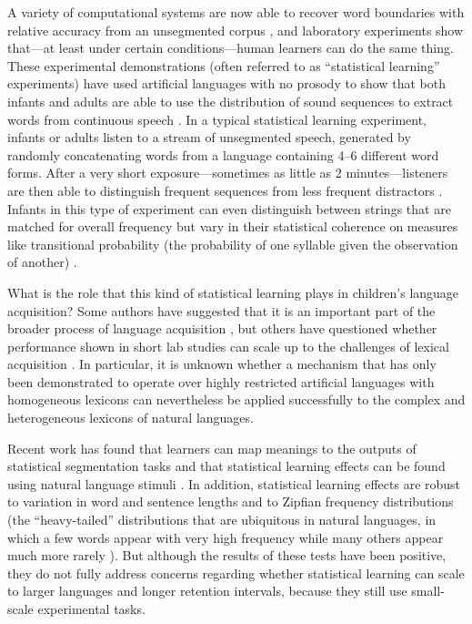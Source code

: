 \documentclass[10pt]{article}
\begin{document}
A variety of computational systems are now able to recover word boundaries with relative accuracy from an unsegmented corpus \cite{goldwater2009,brent1999a}, and laboratory experiments show that---at least under certain conditions---human learners can do the same thing. These experimental demonstrations (often referred to as ``statistical learning'' experiments) have used artificial languages with no prosody to show that both infants and adults are able to use the distribution of sound sequences to extract words from continuous speech \cite{saffran1996a,saffran1996b}. In a typical statistical learning experiment, infants or adults listen to a stream of unsegmented speech, generated by randomly concatenating words from a language containing 4--6 different word forms. After a very short exposure---sometimes as little as 2 minutes---listeners are then able to distinguish frequent sequences from less frequent distractors \cite{saffran1996a}. Infants in this type of experiment can even distinguish between strings that are matched for overall frequency but vary in their statistical coherence on measures like transitional probability (the probability of one syllable given the observation of another) \cite{aslin1998}.

What is the role that this kind of statistical learning plays in children's language acquisition? Some authors have suggested that it is an important part of the broader process of language acquisition \cite{bates1996,saffran2003,kuhl2004}, but others have questioned whether performance shown in short lab studies can scale up to the challenges of lexical acquisition \cite{johnson2010,yang2004,yang2008}. In particular, it is unknown whether a mechanism that has only been demonstrated to operate over highly restricted artificial languages with homogeneous lexicons can nevertheless be applied successfully to the complex and heterogeneous lexicons of natural languages. 

Recent work has found that learners can map meanings to the outputs of statistical segmentation tasks \cite{estes2007,mirman2008,shukla2011} and that statistical learning effects can be found using natural language stimuli \cite{hay2011,pelucchi2009}. In addition, statistical learning effects are robust to variation in word and sentence lengths \cite{frank2010} and to Zipfian frequency distributions (the ``heavy-tailed'' distributions that are ubiquitous in natural languages, in which a few words appear with very high frequency while many others appear much more rarely \cite{kurumada2011}). But although the results of these tests have been positive, they do not fully address concerns regarding whether statistical learning can scale to larger languages and longer retention intervals, because they still use small-scale experimental tasks.
\end{document}
